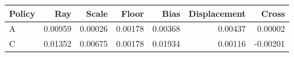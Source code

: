 \begin{tabular}{lrrrrrr}
\toprule
Policy & Ray & Scale & Floor & Bias & Displacement & Cross \\
\midrule
A & 0.00959 & 0.00026 & 0.00178 & 0.00368 & 0.00437 & 0.00002 \\
C & 0.01352 & 0.00675 & 0.00178 & 0.01934 & 0.00116 & -0.00201 \\
\bottomrule
\end{tabular}
